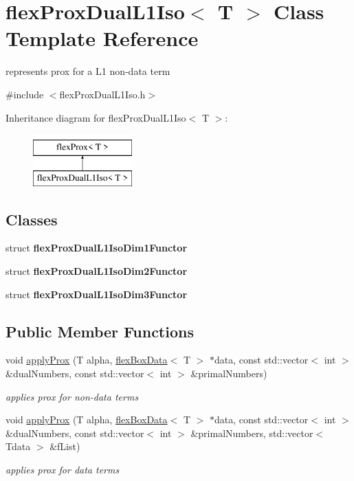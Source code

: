 \hypertarget{classflex_prox_dual_l1_iso}{}\section{flex\+Prox\+Dual\+L1\+Iso$<$ T $>$ Class Template Reference}
\label{classflex_prox_dual_l1_iso}


represents prox for a L1 non-\/data term  




{\ttfamily \#include $<$flex\+Prox\+Dual\+L1\+Iso.\+h$>$}

Inheritance diagram for flex\+Prox\+Dual\+L1\+Iso$<$ T $>$\+:\begin{figure}[H]
\begin{center}
\leavevmode
\includegraphics[height=2.000000cm]{classflex_prox_dual_l1_iso}
\end{center}
\end{figure}
\subsection*{Classes}
\begin{DoxyCompactItemize}
\item 
struct {\bfseries flex\+Prox\+Dual\+L1\+Iso\+Dim1\+Functor}
\item 
struct {\bfseries flex\+Prox\+Dual\+L1\+Iso\+Dim2\+Functor}
\item 
struct {\bfseries flex\+Prox\+Dual\+L1\+Iso\+Dim3\+Functor}
\end{DoxyCompactItemize}
\subsection*{Public Member Functions}
\begin{DoxyCompactItemize}
\item 
void \hyperlink{classflex_prox_dual_l1_iso_afbf9d355a5c633355233f6b7d6026465}{apply\+Prox} (T alpha, \hyperlink{classflex_box_data}{flex\+Box\+Data}$<$ T $>$ $\ast$data, const std\+::vector$<$ int $>$ \&dual\+Numbers, const std\+::vector$<$ int $>$ \&primal\+Numbers)
\begin{DoxyCompactList}\small\item\em applies prox for non-\/data terms \end{DoxyCompactList}\item 
void \hyperlink{classflex_prox_dual_l1_iso_a5cd236c5d3e58b9424b1021694c44590}{apply\+Prox} (T alpha, \hyperlink{classflex_box_data}{flex\+Box\+Data}$<$ T $>$ $\ast$data, const std\+::vector$<$ int $>$ \&dual\+Numbers, const std\+::vector$<$ int $>$ \&primal\+Numbers, std\+::vector$<$ Tdata $>$ \&f\+List)
\begin{DoxyCompactList}\small\item\em applies prox for data terms \end{DoxyCompactList}\end{DoxyCompactItemize}
